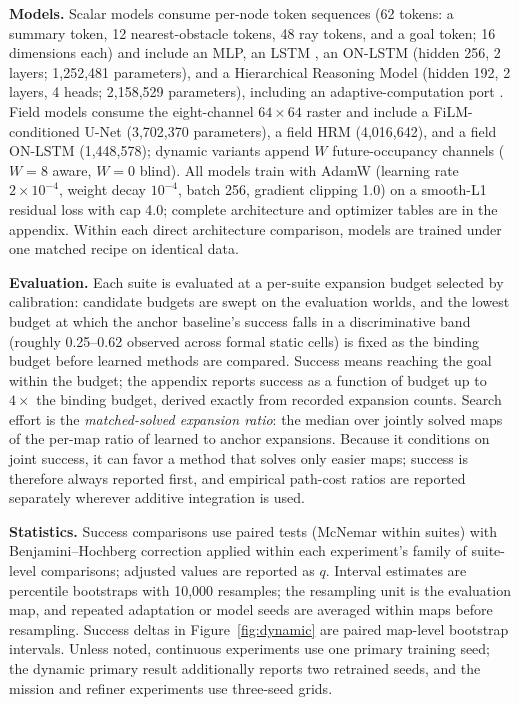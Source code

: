 \documentclass[letterpaper]{article} %
\begin{document}
\textbf{Models.} Scalar models consume per-node token sequences (62 tokens: a summary token, 12 nearest-obstacle tokens, 48 ray tokens, and a goal token; 16 dimensions each) and include an MLP, an LSTM \citep{hochreiter1997lstm}, an ON-LSTM \citep{shen2019onlstm} (hidden 256, 2 layers; 1{,}252{,}481 parameters), and a Hierarchical Reasoning Model \citep[HRM;][]{wang2025hrm} (hidden 192, 2 layers, 4 heads; 2{,}158{,}529 parameters), including an adaptive-computation port \citep{graves2016act,banino2021pondernet}. Field models consume the eight-channel $64{\times}64$ raster and include a FiLM-conditioned U-Net \citep{ronneberger2015unet,perez2018film} (3{,}702{,}370 parameters), a field HRM (4{,}016{,}642), and a field ON-LSTM (1{,}448{,}578); dynamic variants append $W$ future-occupancy channels ($W{=}8$ aware, $W{=}0$ blind). All models train with AdamW (learning rate $2{\times}10^{-4}$, weight decay $10^{-4}$, batch 256, gradient clipping 1.0) on a smooth-L1 residual loss with cap 4.0; complete architecture and optimizer tables are in the appendix. Within each direct architecture comparison, models are trained under one matched recipe on identical data.

\textbf{Evaluation.} Each suite is evaluated at a per-suite expansion budget selected by calibration: candidate budgets are swept on the evaluation worlds, and the lowest budget at which the anchor baseline's success falls in a discriminative band (roughly 0.25--0.62 observed across formal static cells) is fixed as the binding budget before learned methods are compared. Success means reaching the goal within the budget; the appendix reports success as a function of budget up to $4\times$ the binding budget, derived exactly from recorded expansion counts. Search effort is the \emph{matched-solved expansion ratio}: the median over jointly solved maps of the per-map ratio of learned to anchor expansions. Because it conditions on joint success, it can favor a method that solves only easier maps; success is therefore always reported first, and empirical path-cost ratios are reported separately wherever additive integration is used.

\textbf{Statistics.} Success comparisons use paired tests (McNemar within suites) with Benjamini--Hochberg correction applied within each experiment's family of suite-level comparisons; adjusted values are reported as $q$. Interval estimates are percentile bootstraps with 10{,}000 resamples; the resampling unit is the evaluation map, and repeated adaptation or model seeds are averaged within maps before resampling. Success deltas in Figure~\ref{fig:dynamic} are paired map-level bootstrap intervals. Unless noted, continuous experiments use one primary training seed; the dynamic primary result additionally reports two retrained seeds, and the mission and refiner experiments use three-seed grids.
\end{document}
